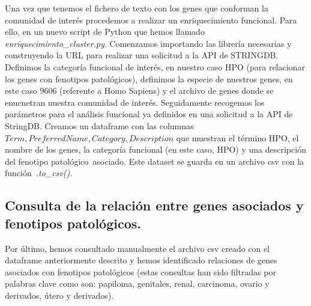 \vspace{3pt}

Una vez que tenemos el fichero de texto con los genes que conforman la comunidad de interés procedemos a realizar un enriquecimiento funcional. Para ello, en un nuevo script de Python que hemos llamado \textit{enriquecimiento\_cluster.py}. Comenzamos importando las librería necesarias y construyendo la URL para realizar una solicitud a la API de STRINGDB. Definimos la categoría funcional de interés, en nuestro caso HPO (para relacionar los genes con fenotipos patológicos), definimos la especie de nuestros genes, en este caso 9606 (referente a Homo Sapiens) y el archivo de genes donde se enucnetran nuestra comunidad de interés. Seguidamente recogemos los parámetros para el análisis funcional ya definidos en una solicitud a la API de StringDB. Creamos un dataframe con las columnas $Term, Preferred Name, Category, Description$ que muestran el término HPO, el nombre de los genes, la categoría funcional (en este caso, HPO) y una descripción del fenotipo patológico asociado.
Este dataset se guarda en un archivo csv con la función \textit{.to\_csv()}.

\vspace{3pt}

\subsection{Consulta de la relación entre genes asociados y fenotipos patológicos.}

Por último, hemos consultado manualmente el archivo csv creado con el dataframe anteriormente descrito y hemos identificado relaciones de genes asociados con fenotipos patológicos (estas consultas han sido filtradas por palabras clave como son: papiloma, genitales, renal, carcinoma, ovario y derivados, útero y derivados).


